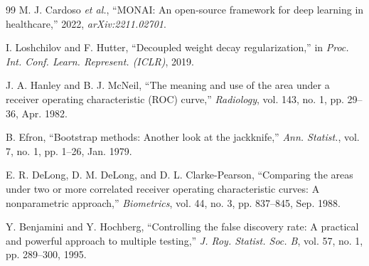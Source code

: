 \documentclass[journal]{IEEEtran}
\begin{document}
\begin{thebibliography}{99}
 M. J. Cardoso \emph{et al.}, ``MONAI: An open-source framework for deep learning in healthcare,'' 2022, \emph{arXiv:2211.02701}.

 I. Loshchilov and F. Hutter, ``Decoupled weight decay regularization,'' in \emph{Proc. Int. Conf. Learn. Represent. (ICLR)}, 2019.

 J. A. Hanley and B. J. McNeil, ``The meaning and use of the area under a receiver operating characteristic (ROC) curve,'' \emph{Radiology}, vol. 143, no. 1, pp. 29--36, Apr. 1982.

 B. Efron, ``Bootstrap methods: Another look at the jackknife,'' \emph{Ann. Statist.}, vol. 7, no. 1, pp. 1--26, Jan. 1979.

 E. R. DeLong, D. M. DeLong, and D. L. Clarke-Pearson, ``Comparing the areas under two or more correlated receiver operating characteristic curves: A nonparametric approach,'' \emph{Biometrics}, vol. 44, no. 3, pp. 837--845, Sep. 1988.

 Y. Benjamini and Y. Hochberg, ``Controlling the false discovery rate: A practical and powerful approach to multiple testing,'' \emph{J. Roy. Statist. Soc. B}, vol. 57, no. 1, pp. 289--300, 1995.

\end{thebibliography}
\end{document}
